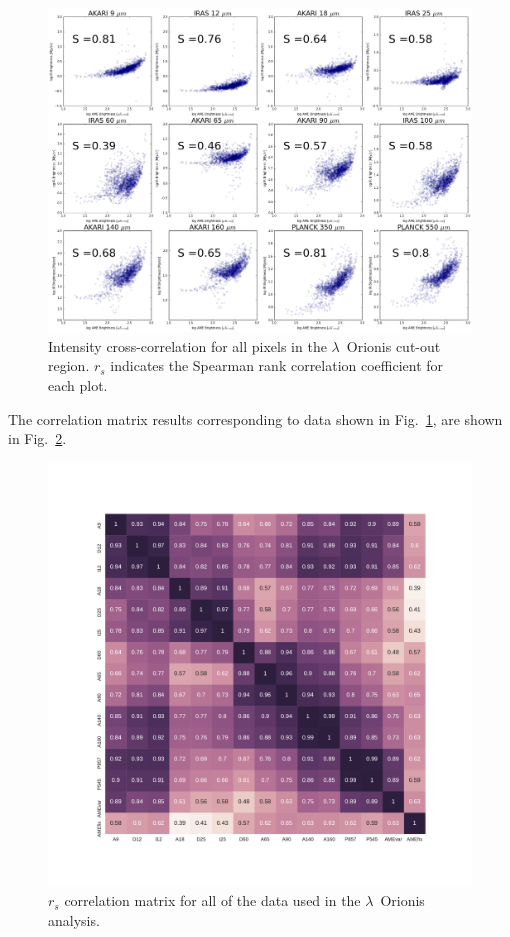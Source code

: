                 \begin{figure}
                  \includegraphics[width=\textwidth]{../Plots/orionis_correlations_AME.png}
                  \centering
                  \caption{Intensity cross-correlation for all pixels in the $\lambda$~Orionis cut-out region.  $r_{s}$ indicates the Spearman rank correlation coefficient for each plot.}
                  \label{fig:orionis-corr}
                \end{figure}
            The correlation matrix results corresponding to data shown in Fig.~\ref{fig:orionis-corr}, are shown in Fig.~\ref{fig:orionis-corr-matrix}.
                \begin{figure}
                  \includegraphics[width=\textwidth]{../Plots/ch_lori/Lori_corrmatrix_I.pdf}
                  \centering
                  \caption{$r_{s}$ correlation matrix for all of the data used in the $\lambda$~Orionis analysis.}
                  \label{fig:orionis-corr-matrix}
                \end{figure}
